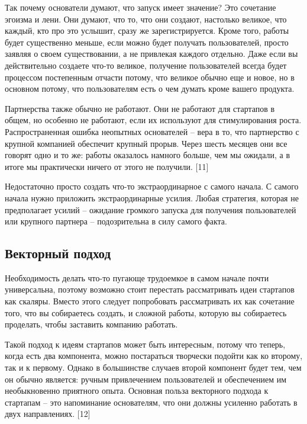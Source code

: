 \documentclass[ebook,12pt,oneside,openany]{memoir}
\begin{document}
Так почему основатели думают, что запуск имеет значение? Это сочетание
эгоизма и лени. Они думают, что то, что они создают, настолько
великое, что каждый, кто про это услышит, сразу же зарегистрируется.
Кроме того, работы будет существенно меньше, если можно будет получать
пользователей, просто заявляя о своем существовании, а не привлекая
каждого отдельно. Даже если вы действительно создаете что-то великое,
получение пользователей всегда будет процессом постепенным отчасти
потому, что великое обычно еще и новое, но в основном потому, что
пользователям есть о чем думать кроме вашего продукта. \newline

Партнерства также обычно не работают. Они не работают для стартапов в
общем, но особенно не работают, если их используют для стимулирования
роста. Распространенная ошибка неопытных основателей – вера в то, что
партнерство с крупной компанией обеспечит крупный прорыв. Через шесть
месяцев они все говорят одно и то же: работы оказалось намного больше,
чем мы ожидали, а в итоге мы практически ничего от этого не получили.
[11] \newline

Недостаточно просто создать что-то экстраординарное с самого начала. С
самого начала нужно приложить экстраординарные усилия. Любая
стратегия, которая не предполагает усилий – ожидание громкого запуска
для получения пользователей или крупного партнера – подозрительна в
силу самого факта. \newline

\subsection{Векторный подход}

Необходимость делать что-то пугающе трудоемкое в самом начале почти
универсальна, поэтому возможно стоит перестать рассматривать идеи
стартапов как скаляры. Вместо этого следует попробовать рассматривать
их как сочетание того, что вы собираетесь создать, и сложной работы,
которую вы собираетесь проделать, чтобы заставить компанию работать.
\newline

Такой подход к идеям стартапов может быть интересным, потому что
теперь, когда есть два компонента, можно постараться творчески подойти
как ко второму, так и к первому. Однако в большинстве случаев второй
компонент будет тем, чем он обычно является: ручным привлечением
пользователей и обеспечением им необыкновенно приятного опыта.
Основная польза векторного подхода к стартапам – это напоминание
основателям, что они должны усиленно работать в двух направлениях.
[12] \newline
\end{document}
